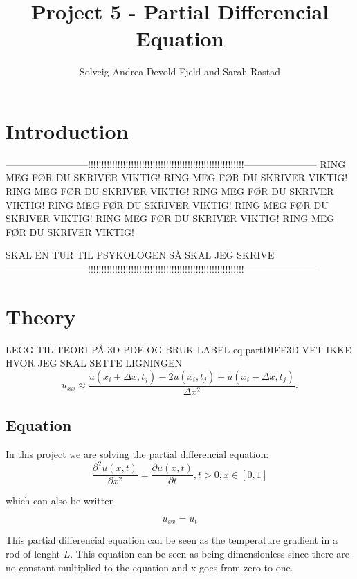 \documentclass[a4paper,10pt]{article}
\title{Project 5 - Partial Differencial Equation}
\author{Solveig Andrea Devold Fjeld and Sarah Rastad}
\begin{document}
\maketitle

\begin{abstract}

\end{abstract}

\section{Introduction}
--------------------------!!!!!!!!!!!!!!!!!!!!!!!!!!!!!!!!!!!!!!!!!!!!!!!!!!!!!!!!!!-----------------------
RING MEG FØR DU SKRIVER VIKTIG!
RING MEG FØR DU SKRIVER VIKTIG!
RING MEG FØR DU SKRIVER VIKTIG!
RING MEG FØR DU SKRIVER VIKTIG!
RING MEG FØR DU SKRIVER VIKTIG!
RING MEG FØR DU SKRIVER VIKTIG!
RING MEG FØR DU SKRIVER VIKTIG!
RING MEG FØR DU SKRIVER VIKTIG!

SKAL EN TUR TIL PSYKOLOGEN SÅ SKAL JEG SKRIVE
--------------------------!!!!!!!!!!!!!!!!!!!!!!!!!!!!!!!!!!!!!!!!!!!!!!!!!!!!!!!!!!-----------------------


\section{Theory}
LEGG TIL TEORI PÅ 3D PDE OG BRUK LABEL eq:partDIFF3D
VET IKKE HVOR JEG SKAL SETTE LIGNINGEN
\begin{equation}
u_{xx}\approx \frac{u(x_i+\Delta x,t_j)-2u(x_i,t_j)+u(x_i-\Delta x,t_j)}{\Delta x^2}.
\label{eq:u_xx}
\end{equation}

\subsection{Equation}
In this project we are solving the partial differencial equation:
\begin{equation}
  \frac{\partial^2 u(x,t)}{\partial x^2} =\frac{\partial u(x,t)}{\partial t}, t> 0, x\in [0,1]
  \label{eq:PartDiff}
\end{equation}

which can also be written

\begin{equation}
 u_{xx}=u_t
 \label{eq:simpleDiff}
\end{equation}

This partial differencial equation can be seen as the temperature gradient in a rod of lenght $L$. This equation can be seen as being dimensionless
since there are no constant multiplied to the equation and x goes from zero to one.
\end{document}

